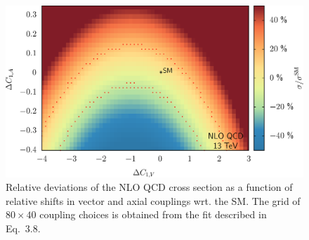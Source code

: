 \documentclass[preprint]{JHEP3}
\begin{document}
\begin{figure}[t]
\centering
\includegraphics[scale=0.6]{LHC_53_SigmaNLO.eps}
\caption{ \label{fig:viii} Relative deviations of the NLO QCD cross section as a function of relative shifts in vector and axial couplings wrt. the SM.
The grid of $ 80 \times 40 $ coupling choices is obtained from the fit described in Eq.~3.8. }
\end{figure}
\end{document}
